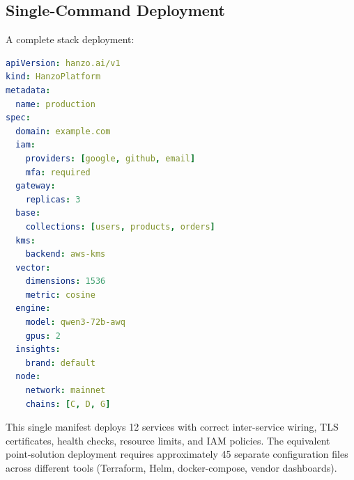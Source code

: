 \subsection{Single-Command Deployment}

A complete stack deployment:

\begin{lstlisting}[language=YAML,caption={Minimal Hanzo stack deployment.}]
apiVersion: hanzo.ai/v1
kind: HanzoPlatform
metadata:
  name: production
spec:
  domain: example.com
  iam:
    providers: [google, github, email]
    mfa: required
  gateway:
    replicas: 3
  base:
    collections: [users, products, orders]
  kms:
    backend: aws-kms
  vector:
    dimensions: 1536
    metric: cosine
  engine:
    model: qwen3-72b-awq
    gpus: 2
  insights:
    brand: default
  node:
    network: mainnet
    chains: [C, D, G]
\end{lstlisting}

This single manifest deploys 12 services with correct inter-service wiring, TLS certificates, health checks, resource limits, and IAM policies. The equivalent point-solution deployment requires approximately 45 separate configuration files across different tools (Terraform, Helm, docker-compose, vendor dashboards).

